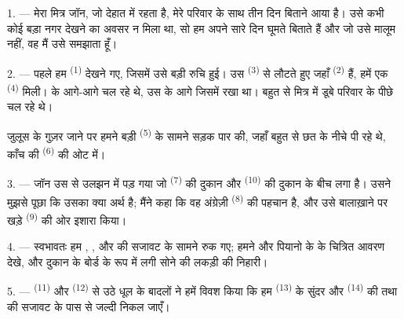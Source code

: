 
\VUsaut{4.0mm}
\VUsaut{3.0mm}

\VUsaut{3.0mm}

1. --- मेरा मित्र जॉन, जो देहात में रहता है, मेरे परिवार के साथ तीन दिन बिताने
आया है।  उसे कभी कोई बड़ा नगर देखने का अवसर न मिला था, सो हम अपने
सारे दिन घूमते बिताते हैं और जो उसे मालूम नहीं, वह मैं उसे समझाता हूँ।

2. --- पहले हम  \textsuperscript{(1)} देखने गए, जिसमें उसे बड़ी
रुचि हुई। उस  \textsuperscript{(3)} से लौटते हुए जहाँ
 \textsuperscript{(2)} हैं, हमें एक 
\textsuperscript{(4)} मिली।  के आगे-आगे  चल रहे
थे, उस  के आगे जिसमें  रखा था। बहुत से मित्र
 में डूबे परिवार के पीछे चल रहे थे।

जुलूस के गुज़र जाने पर हमने बड़ी  \textsuperscript{(5)} के सामने
सड़क पार की, जहाँ बहुत से  छत के नीचे  पी रहे थे,
काँच की  \textsuperscript{(6)} की ओट में।

3. --- जॉन उस  से उलझन में पड़ गया जो 
\textsuperscript{(7)} की दुकान और  \textsuperscript{(10)} की
दुकान के बीच लगा है। उसने मुझसे पूछा कि उसका क्या अर्थ है; मैंने कहा कि वह
अंग्रेज़ी  \textsuperscript{(8)} की पहचान है, और उसे
बालाख़ाने पर खड़े  \textsuperscript{(9)} की ओर इशारा किया।

\VUsaut{3.0mm}

4. --- स्वभावतः हम , ,  और
 की सजावट के सामने रुक गए; हमने  और पियानो के
 के चित्रित आवरण देखे, और दुकान के बोर्ड के रूप में लगी सोने की
लकड़ी की  निहारी।

5. ---  \textsuperscript{(11)} और
 \textsuperscript{(12)} से उठे धूल के बादलों ने हमें विवश
किया कि हम  \textsuperscript{(13)} के सुंदर
 और  \textsuperscript{(14)} की
 तथा  की सजावट के पास से जल्दी निकल जाएँ।

